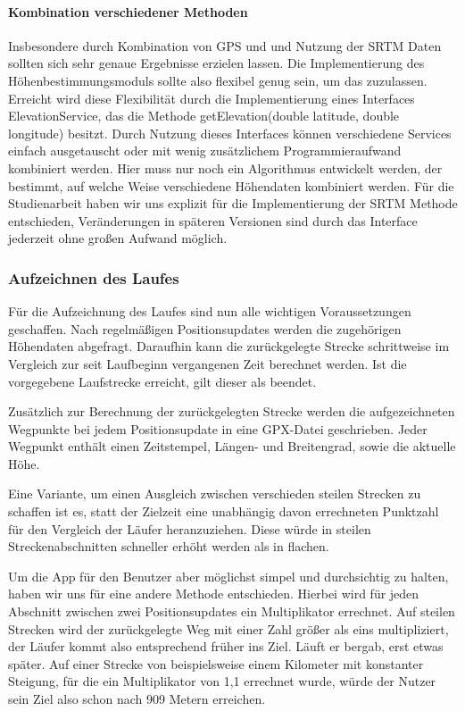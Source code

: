 \paragraph{Kombination verschiedener Methoden}
Insbesondere durch Kombination von GPS und und Nutzung der SRTM Daten sollten sich sehr genaue Ergebnisse erzielen lassen. Die Implementierung des Höhenbestimmungsmoduls sollte also flexibel genug sein, um das zuzulassen. Erreicht wird diese Flexibilität durch die Implementierung eines Interfaces ElevationService, das die Methode getElevation(double latitude, double longitude) besitzt. Durch Nutzung dieses Interfaces können verschiedene Services einfach ausgetauscht oder mit wenig zusätzlichem Programmieraufwand kombiniert werden. Hier muss nur noch ein Algorithmus entwickelt werden, der bestimmt, auf welche Weise verschiedene Höhendaten kombiniert werden. Für die Studienarbeit haben wir uns explizit für die Implementierung der SRTM Methode entschieden, Veränderungen in späteren Versionen sind durch das Interface jederzeit ohne großen Aufwand möglich.
\subsubsection{Aufzeichnen des Laufes}
Für die Aufzeichnung des Laufes sind nun alle wichtigen Voraussetzungen geschaffen. Nach regelmäßigen Positionsupdates werden die zugehörigen Höhendaten abgefragt. Daraufhin kann die zurückgelegte Strecke schrittweise im Vergleich zur seit Laufbeginn vergangenen Zeit berechnet werden. Ist die vorgegebene Laufstrecke erreicht, gilt dieser als beendet.

Zusätzlich zur Berechnung der zurückgelegten Strecke werden die aufgezeichneten Wegpunkte bei jedem Positionsupdate in eine GPX-Datei geschrieben. Jeder Wegpunkt enthält einen Zeitstempel, Längen- und Breitengrad, sowie die aktuelle Höhe.

Eine Variante, um einen Ausgleich zwischen verschieden steilen Strecken zu schaffen ist es, statt der Zielzeit eine unabhängig davon errechneten Punktzahl für den Vergleich der Läufer heranzuziehen. Diese würde in steilen Streckenabschnitten schneller erhöht werden als in flachen.

Um die App für den Benutzer aber möglichst simpel und durchsichtig zu halten, haben wir uns für eine andere Methode entschieden. Hierbei wird für jeden Abschnitt zwischen zwei Positionsupdates ein Multiplikator errechnet. Auf steilen Strecken wird der zurückgelegte Weg mit einer Zahl größer als eins multipliziert, der Läufer kommt also entsprechend früher ins Ziel. Läuft er bergab, erst etwas später. Auf einer Strecke von beispielsweise einem Kilometer mit konstanter Steigung, für die ein Multiplikator von 1,1 errechnet wurde, würde der Nutzer sein Ziel also schon nach 909 Metern erreichen.

